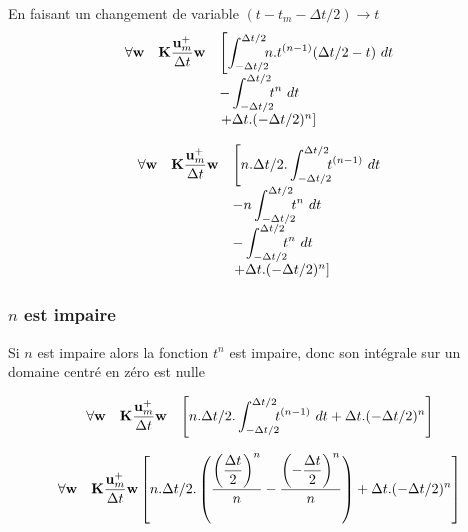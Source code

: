 \documentclass[12pt,a4paper]{report}
\begin{document}
En faisant un changement de variable $(t-t_m- \Delta t/2) \rightarrow t$
\begin{equation}
\begin{array}{r l l}
	\forall \mathbf{w}
	&\displaystyle
	 \mathbf{K} \frac{\mathbf{u}_m^+}{\Delta t} \mathbf{w}	 	
	 		&\left[ \displaystyle
	 	  		\int_{-\Delta t/2}^{\Delta t/2} \!\!\! 
	 	  			n.t^{(n-1)}(\Delta t/2-t) ~dt
	 	  	\right.
	 	\\&	& \displaystyle
	 	 		-\int_{-\Delta t/2}^{\Delta t/2} \!\!\!  t^n 	~dt
	 	\\&	&\left. + \Delta t .(-\Delta t/2)^n
	 	\right]
\end{array}
\end{equation}


\begin{equation}
\begin{array}{r l l}
	\forall \mathbf{w}
	&\displaystyle
	 \mathbf{K} \frac{\mathbf{u}_m^+}{\Delta t} \mathbf{w}	 	
	 		&\left[ \displaystyle
	 	  		n.\Delta t/2.\int_{-\Delta t/2}^{\Delta t/2} \!\!\! 
	 	  			t^{(n-1)} ~dt
	 	  	\right.
	 	\\&	& \displaystyle
	 	 		- n \int_{-\Delta t/2}^{\Delta t/2} \!\!\!  t^n 	~dt
	 	\\&	& \displaystyle
	 	 		-\int_{-\Delta t/2}^{\Delta t/2} \!\!\!  t^n 	~dt
	 	\\&	&\left. + \Delta t .(-\Delta t/2)^n
	 	\right]
\end{array}
\end{equation}

\subsubsection{$n$ est impaire}
Si $n$ est impaire alors la fonction $t^n$ est impaire, donc son intégrale sur un domaine centré en zéro est nulle

\begin{equation}
\begin{array}{r l l}
	\forall \mathbf{w}
	&\displaystyle
	 \mathbf{K} \frac{\mathbf{u}_m^+}{\Delta t} \mathbf{w}	 	
	 		&\left[ \displaystyle
	 	  		n.\Delta t/2.\int_{-\Delta t/2}^{\Delta t/2} \!\!\! 
	 	  			t^{(n-1)} ~dt
	 	  			 + \Delta t .(-\Delta t/2)^n
	 	\right]
\end{array}
\end{equation}

\begin{equation}
\begin{array}{r l}
	\forall \mathbf{w}
	&\displaystyle
	 \mathbf{K} \frac{\mathbf{u}_m^+}{\Delta t} \mathbf{w}	 	
	 		\left[ \displaystyle
	 	  		n.\Delta t/2. 
	 	  		\left(
	 	  			\frac{\left( \displaystyle\frac{\Delta t}{2} \right)^n}{n} 
	 	  			-\frac{\left(-\displaystyle\frac{\Delta t}{2}\right)^n}{n} 
	 	  		\right)
	 	  			 + \Delta t .(-\Delta t/2)^n
	 	\right]
\end{array}
\end{equation}
\end{document}
